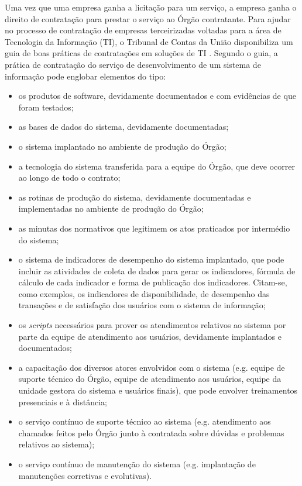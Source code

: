 Uma vez que uma empresa ganha a licitação para um serviço, a empresa ganha o direito de contratação para prestar o serviço ao Órgão contratante. Para ajudar no processo de contratação de empresas terceirizadas voltadas para a área de Tecnologia da Informação (TI), o Tribunal de Contas da União disponibiliza um guia de boas práticas de contratações em soluções de TI \cite{guia_boas_praticas}. Segundo o guia, a prática de contratação do serviço de desenvolvimento de um sistema de informação pode englobar elementos do tipo:
\begin{itemize}
\item os produtos de software, devidamente documentados e com evidências de que foram testados;
\item as bases de dados do sistema, devidamente documentadas;
\item o sistema implantado no ambiente de produção do Órgão;
\item a tecnologia do sistema transferida para a equipe do Órgão, que deve ocorrer ao longo de todo o contrato;
\item as rotinas de produção do sistema, devidamente documentadas e implementadas no ambiente de produção do Órgão;
\item as minutas dos normativos que legitimem os atos praticados por intermédio do sistema;
\item o sistema de indicadores de desempenho do sistema implantado, que pode incluir as atividades de coleta de dados para gerar os indicadores, fórmula de cálculo de cada indicador e forma de publicação dos indicadores. Citam-se, como exemplos, os indicadores de disponibilidade, de desempenho das transações e de satisfação dos usuários com o sistema de informação;
\item os \textit{scripts} necessários para prover os atendimentos relativos ao sistema por parte da equipe de atendimento aos usuários, devidamente implantados e documentados;
\item a capacitação dos diversos atores envolvidos com o sistema (e.g. equipe de suporte técnico do Órgão, equipe de atendimento aos usuários, equipe da unidade gestora do sistema e usuários finais), que pode envolver treinamentos presenciais e à distância;
\item o serviço contínuo de suporte técnico ao sistema (e.g. atendimento aos chamados feitos pelo Órgão junto à contratada sobre dúvidas e problemas relativos ao sistema);
\item o serviço contínuo de manutenção do sistema (e.g. implantação de manutenções corretivas e evolutivas).
\end{itemize} 

